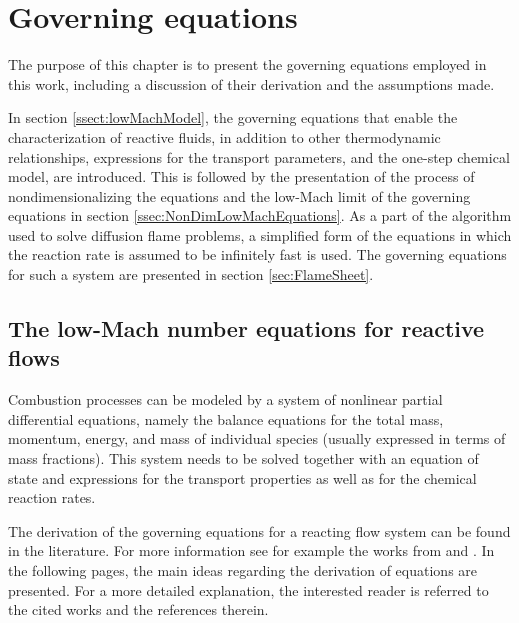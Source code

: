 \chapter{Governing equations}	\label{ch:gov_eqs}
The purpose of this chapter is to present the governing equations employed in this work, including a discussion of their derivation and the assumptions made.

In section \ref{ssect:lowMachModel}, the governing equations that enable the characterization of reactive fluids, in addition to other thermodynamic relationships, expressions for the transport parameters, and the one-step chemical model, are introduced. This is followed by the presentation of the process of nondimensionalizing the equations and the low-Mach limit of the governing equations in section \ref{ssec:NonDimLowMachEquations}.  As a part of the algorithm used to solve diffusion flame problems, a simplified form of the equations in which the reaction rate is assumed to be infinitely fast is used. The governing equations for such a system are presented in section \ref{sec:FlameSheet}.

\section{The low-Mach number equations for reactive flows} \label{sec:GovEqLowMach}
Combustion processes can be modeled by a system of nonlinear partial differential equations, namely the balance equations for the total mass, momentum, energy, and mass of individual species (usually expressed in terms of mass fractions). This system needs to be solved together with an equation of state and expressions for the transport properties as well as for the chemical reaction rates.

The derivation of the governing equations for a reacting flow system can be found in the literature. For more information see for example the works from \textcite{keeChemicallyReactingFlow2003} and \textcite{poinsotTheoreticalNumericalCombustion2011}. In the following pages, the main ideas regarding the derivation of equations are presented. For a more detailed explanation,  the interested reader is referred to the cited works and the references therein.

